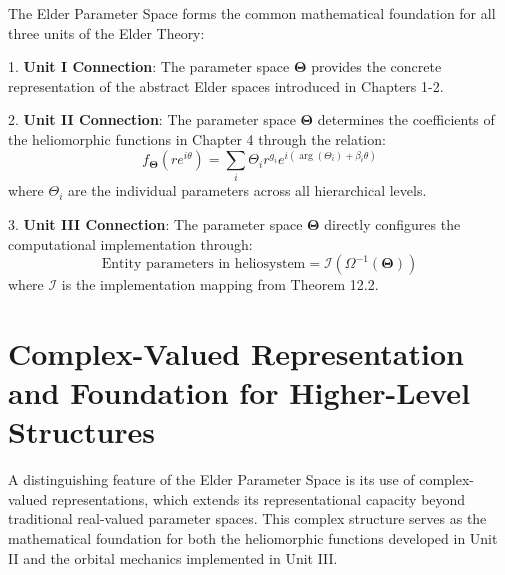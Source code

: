 \begin{theorem}
\label{thm:parameter_coherence}
The Elder Parameter Space forms the common mathematical foundation for all three units of the Elder Theory:

1. \textbf{Unit I Connection}: The parameter space $\boldsymbol{\Theta}$ provides the concrete representation of the abstract Elder spaces introduced in Chapters 1-2.

2. \textbf{Unit II Connection}: The parameter space $\boldsymbol{\Theta}$ determines the coefficients of the heliomorphic functions in Chapter 4 through the relation:
\begin{equation}
f_{\boldsymbol{\Theta}}(re^{i\theta}) = \sum_{i} \Theta_i r^{g_i} e^{i(\arg(\Theta_i) + \beta_i \theta)}
\end{equation}
where $\Theta_i$ are the individual parameters across all hierarchical levels.

3. \textbf{Unit III Connection}: The parameter space $\boldsymbol{\Theta}$ directly configures the computational implementation through:
\begin{equation}
\text{Entity parameters in heliosystem} = \mathcal{I}(\Omega^{-1}(\boldsymbol{\Theta}))
\end{equation}
where $\mathcal{I}$ is the implementation mapping from Theorem 12.2.
\end{theorem}

\section{Complex-Valued Representation and Foundation for Higher-Level Structures}

A distinguishing feature of the Elder Parameter Space is its use of complex-valued representations, which extends its representational capacity beyond traditional real-valued parameter spaces. This complex structure serves as the mathematical foundation for both the heliomorphic functions developed in Unit II and the orbital mechanics implemented in Unit III.

